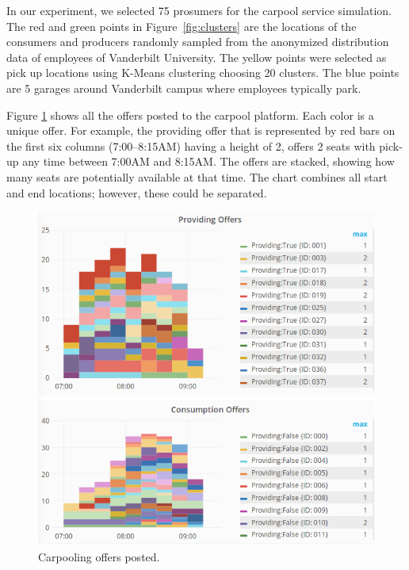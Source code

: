 In our experiment, we selected 75 prosumers for the carpool service simulation. The red and green points in Figure~\ref{fig:clusters} are the locations of the consumers and producers randomly sampled from the anonymized distribution data of employees of Vanderbilt University. The yellow points were selected as pick up locations using K-Means clustering choosing 20 clusters. The blue points are 5 garages around Vanderbilt campus where employees typically park.  

Figure \ref{fig:offers} shows all the offers posted to the carpool platform. Each color is a unique offer. For example, the providing offer that is represented by red bars on the first six columns (7:00--8:15AM) having a height of 2, offers 2 seats with pick-up any time between 7:00AM and 8:15AM. The offers are stacked, showing how many seats are potentially available at that time. The chart combines all start and end locations; however, these could be separated. 

\begin{figure}[t]
\includegraphics[width=\columnwidth]{figs/Offers.png}
\caption{Carpooling offers posted.}
\label{fig:offers}
\end{figure}

